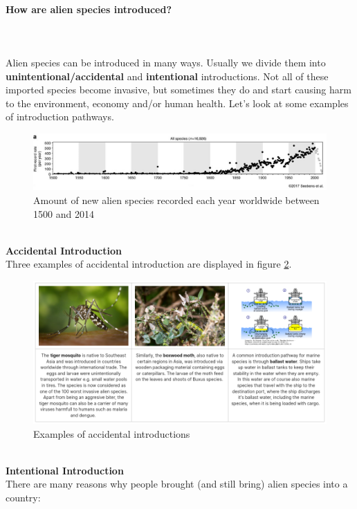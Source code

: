 \documentclass[../summary.tex]{subfiles}
\begin{document}
\paragraph{How are alien species introduced?}
 \ \\\\
 Alien species can be introduced in many ways. Usually we divide them into \textbf{unintentional/accidental} and \textbf{intentional} introductions. Not all of these imported species become invasive, but sometimes they do and start causing harm to the environment, economy and/or human health. Let's look at some examples of introduction pathways.
 
 \begin{figure}[H]
 	\centering
 	\includegraphics[width=0.8\linewidth]{../images/Alien_species_through_time}
 	\caption{Amount of new alien species recorded each year worldwide between 1500 and 2014}
 	\label{fig:alienspeciesthroughtime}
 \end{figure}
 \ \\
\textbf{ Accidental Introduction}\\
 Three examples of accidental introduction are displayed in figure \ref{fig:accidentalintroduction}.
 
 \begin{figure}[H]
 	\centering
 	\includegraphics[width=0.9\linewidth]{../images/accidental_introduction}
 	\caption{Examples of accidental introductions}
 	\label{fig:accidentalintroduction}
 \end{figure}
 
 \newpage
 \ \\
 \textbf{ Intentional Introduction}\\
There are many reasons why people brought (and still bring) alien species into a country:
\end{document}
